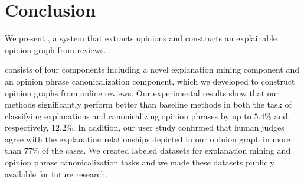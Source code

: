 \section{Conclusion} \label{sec:conclusion}
We present \system, a system that extracts opinions and constructs an explainable opinion graph from reviews.
%

\system{} consists of four components including a novel explanation mining component and an opinion phrase canonicalization component, which we developed to construct opinion graphs from online reviews.
%
Our experimental results  show that our methods significantly perform better than baseline methods in both the task of classifying explanations and canonicalizing opinion phrases by up to $5.4\%$ and, respectively, $12.2\%$.
%
In addition, our user study confirmed that human judges agree with the explanation relationships depicted in our opinion graph in more than 77\% of the cases.
We created labeled datasets for explanation mining and opinion phrase canonicalization tasks and we made these datasets publicly available for future research.
